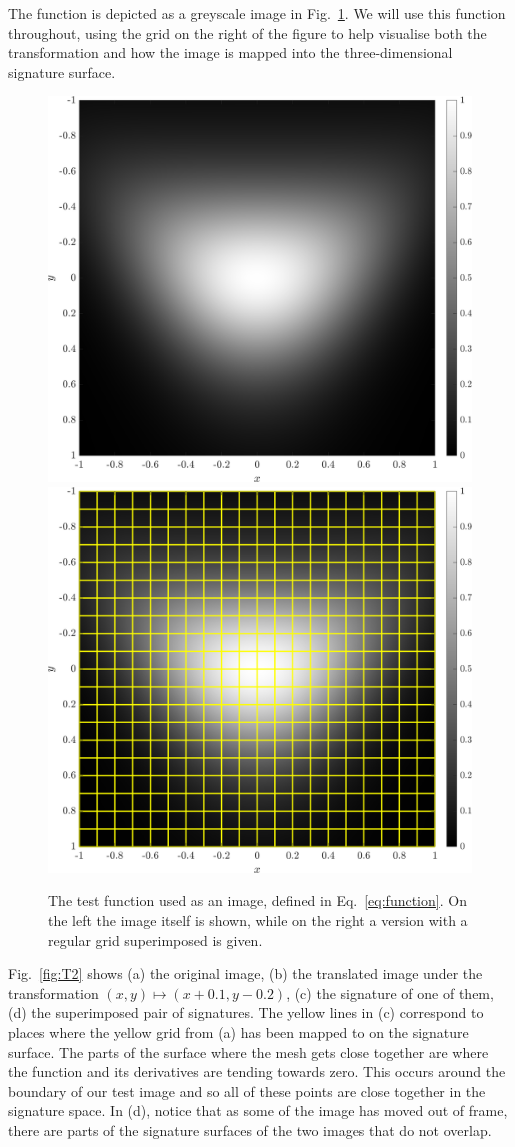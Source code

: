 \documentclass{artjlt}
\begin{document}
The function is depicted as a greyscale image in Fig.~\ref{fig:function}.
We will use this function throughout, using the grid on the right of the figure to help visualise both the transformation and how the image
is mapped into the three-dimensional signature surface. 

\begin{figure}
  \centering
  \includegraphics[width=.45\textwidth]{Figs/function}
  \includegraphics[width=.45\textwidth]{Figs/function_scanlines}
  \caption{The test function used as an image, defined in Eq.~\eqref{eq:function}.
On the left the image itself is shown, while on the right a version with a
regular grid superimposed is given. 
}\label{fig:function}
\end{figure}

Fig.~\ref{fig:T2} shows (a) the original image, (b) the translated image
under the transformation $(x,y) \mapsto (x + 0.1, y - 0.2)$, (c) the
signature of one of them, (d) the superimposed pair of signatures. The
yellow lines in (c) correspond to places where the yellow grid from (a) has been
mapped to on the signature surface. The parts of the surface where the mesh
gets close together are where the function and its derivatives are tending
towards zero. This occurs around the boundary of our test image and so all
of these points are close together in the signature space. In (d), notice
that as some of the image has moved out of frame, there are parts of the
signature surfaces of the two images that do not overlap.
\end{document}
